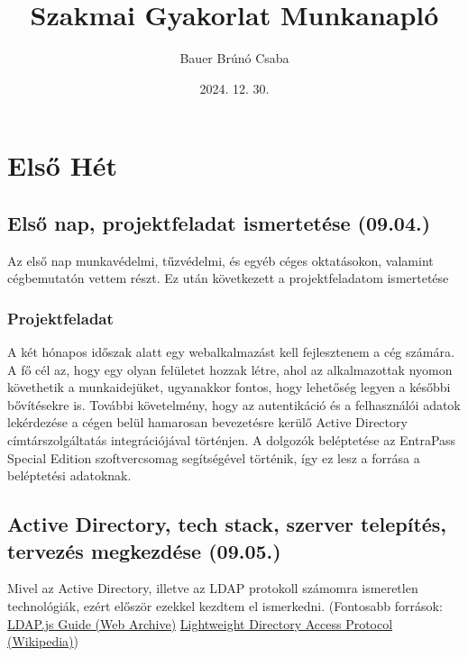 \documentclass[a4paper]{article}
\title{Szakmai Gyakorlat Munkanapló}
\author{Bauer Brúnó Csaba}
\date{2024. 12. 30.}
\begin{document}
\maketitle
\thispagestyle{empty}
\newpage

\clearpage
\tableofcontents
\newpage
{}

\section{Első Hét}

\subsection{Első nap, projektfeladat ismertetése (09.04.)}

Az első nap munkavédelmi, tűzvédelmi, és egyéb céges oktatásokon, valamint cégbemutatón vettem
részt. Ez után következett a projektfeladatom ismertetése

\subsubsection*{Projektfeladat}

A két hónapos időszak alatt egy webalkalmazást kell fejlesztenem a cég számára. A fő cél az, hogy egy
olyan felületet hozzak létre, ahol az alkalmazottak nyomon követhetik a munkaidejüket, ugyanakkor
fontos, hogy lehetőség legyen a későbbi bővítésekre is. További követelmény, hogy az autentikáció és
a felhasználói adatok lekérdezése a cégen belül hamarosan bevezetésre kerülő Active Directory
címtárszolgáltatás integrációjával történjen. A dolgozók beléptetése az EntraPass Special Edition
szoftvercsomag segítségével történik, így ez lesz a forrása a beléptetési adatoknak.

\subsection{Active Directory, tech stack, szerver telepítés, tervezés megkezdése (09.05.)}

Mivel az Active Directory, illetve az LDAP protokoll számomra ismeretlen technológiák, ezért először
ezekkel kezdtem el ismerkedni. (Fontosabb források:
\href{http://web.archive.org/web/20240315064825/http://ldapjs.org/guide.html}{LDAP.js Guide (Web Archive)}
\href{https://en.wikipedia.org/wiki/Lightweight_Directory_Access_Protocol}{Lightweight Directory Access Protocol (Wikipedia)})\\
\end{document}

